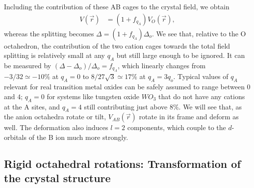 \documentclass[a4paper,prb,twocolumn]{revtex4-1}  %
\newcommand{\com}[1]{}
\begin{document}
Including the contribution of these AB cages to the crystal field,
we obtain
\begin{align}
V(\vec r)  &= (1+f_{q_A}) V_{O}(\vec r),
\end{align}
whereas the 
 splitting becomes
$\Delta = (1+f_{q_A})\Delta_o$.
We see that, relative to the O octahedron,
 the contribution of the
 two cation cages towards the total field splitting
 is relatively small at any $q_A$ but
 still large enough to be ignored.
It can be measured by $(\Delta-\Delta_o)/\Delta_o=f_{q_A}$,
which linearly changes from 
$-3/32\simeq -10\%$ at $q_A=0$
to $8/{27 \sqrt{3}}\simeq 17\%$ at $q_A=3q_o$. 
Typical values of $q_A$ relevant for real transition metal oxides
can be safely assumed to range between $0$ and $4$;  
$q_A=0$ for systems like tungsten oxide $WO_3$ that do not have any cations at the A sites,
and $q_A=4$ still contributing just above $8\%$.
We will see that,
as the anion octahedra rotate or tilt,
$V_{AB}(\vec r)$ rotate in its frame and deform as well.
The deformation also induces $l=2$ components, which couple to the 
$d$-orbitals of the B ion much more strongly. 









\subsection{Rigid octahedral rotations: Transformation of the crystal structure}
\label{sec:structure}

\com{
Coordinates of the Oxygen atoms transform according to 
the rotation matrix $R$.
While the d-orbitals basis states attached to the octahedron transform according to
$\mathcal{R}$.
}
\end{document}
